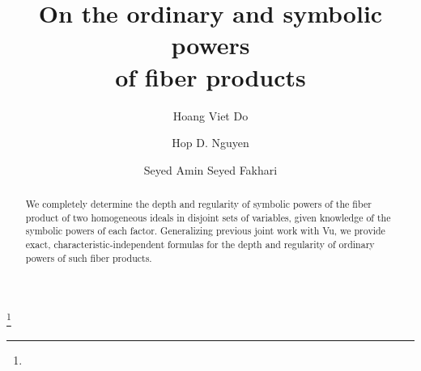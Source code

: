 \documentclass{amsart}
\theoremstyle{plain}
\theoremstyle{definition}
\numberwithin{equation}{section}
\begin{document}

\title[Ordinary and symbolic powers of fiber products]{On the ordinary and symbolic powers\\ of fiber products}

\author[H.V. Do]{Hoang Viet Do}
\address{Institute of Mathematics \\ Vietnam Academy of Science and Technology, 18 Hoang Quoc Viet \\ Hanoi, Vietnam}

\author[H.D. Nguyen]{Hop D. Nguyen}
\address{Institute of Mathematics \\ Vietnam Academy of Science and Technology, 18 Hoang Quoc Viet \\ Hanoi, Vietnam}

\author[S.A. Seyed Fakhari]{Seyed Amin Seyed Fakhari}
\address{Departamento de Matem\'aticas, Universidad de los Andes, Bogot\'a, Colombia}





\begin{abstract}
We completely determine the depth and regularity of symbolic powers of the fiber product of two homogeneous ideals in disjoint sets of variables, given knowledge of the symbolic powers of each factor.  Generalizing previous joint work with Vu, we provide exact, characteristic-independent formulas for the depth and regularity of ordinary powers of such fiber products.
\end{abstract}






\thanks{}

\end{document}
